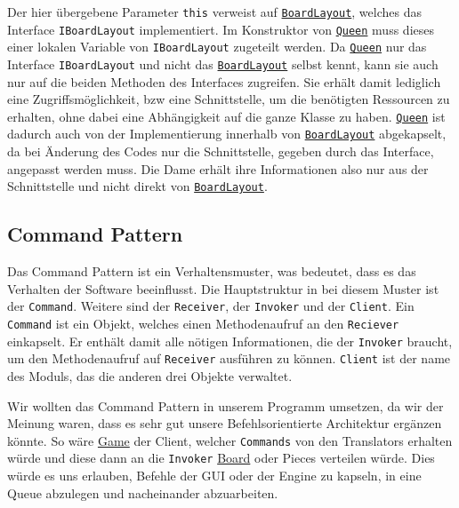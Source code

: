 \documentclass[
10pt, %
a4paper, %
oneside, %
headinclude,footinclude, %
BCOR5mm, %
]{scrartcl}
\begin{document}
\begin{onehalfspace}
Der hier übergebene Parameter \texttt{this} verweist auf \texttt{\href{https://github.com/schmida736/Chess-AdvancedSE/blob/main/Chess-AdvancedSE/Game\%20Elements/BoardLayout.cs}{BoardLayout}}, welches das Interface \texttt{IBoardLayout} implementiert. Im Konstruktor von \texttt{\href{https://github.com/schmida736/Chess-AdvancedSE/blob/main/Chess-AdvancedSE/Game\%20Elements/Pieces/Queen.cs}{Queen}} muss dieses einer lokalen Variable von \texttt{IBoardLayout} zugeteilt werden. Da \texttt{\href{https://github.com/schmida736/Chess-AdvancedSE/blob/main/Chess-AdvancedSE/Game\%20Elements/Pieces/Queen.cs}{Queen}} nur das Interface \texttt{IBoardLayout}
und nicht das \texttt{\href{https://github.com/schmida736/Chess-AdvancedSE/blob/main/Chess-AdvancedSE/Game\%20Elements/BoardLayout.cs}{BoardLayout}} selbst kennt, kann sie auch nur auf die beiden Methoden des Interfaces zugreifen. Sie erhält damit lediglich eine Zugriffsmöglichkeit, bzw eine Schnittstelle, um die benötigten Ressourcen zu erhalten, ohne dabei eine Abhängigkeit auf die ganze Klasse zu haben. \texttt{\href{https://github.com/schmida736/Chess-AdvancedSE/blob/main/Chess-AdvancedSE/Game\%20Elements/Pieces/Queen.cs}{Queen}} ist dadurch auch von der Implementierung innerhalb von \texttt{\href{https://github.com/schmida736/Chess-AdvancedSE/blob/main/Chess-AdvancedSE/Game\%20Elements/BoardLayout.cs}{BoardLayout}} abgekapselt, da bei Änderung des Codes nur die Schnittstelle, gegeben durch das Interface, angepasst werden muss. Die Dame erhält ihre Informationen also nur aus der Schnittstelle und nicht direkt von \texttt{\href{https://github.com/schmida736/Chess-AdvancedSE/blob/main/Chess-AdvancedSE/Game\%20Elements/BoardLayout.cs}{BoardLayout}}.
\subsection{Command Pattern}
Das Command Pattern ist ein Verhaltensmuster, was bedeutet, dass es das Verhalten der Software beeinflusst. Die Hauptstruktur in bei diesem Muster ist der \texttt{Command}. Weitere sind der \texttt{Receiver}, der \texttt{Invoker} und der \texttt{Client}. Ein \texttt{Command} ist ein Objekt, welches einen Methodenaufruf an den \texttt{Reciever} einkapselt. Er enthält damit alle nötigen Informationen, die der \texttt{Invoker} braucht, um den Methodenaufruf auf \texttt{Receiver} ausführen zu können. \texttt{Client} ist der name des Moduls, das die anderen drei Objekte verwaltet.

Wir wollten das Command Pattern in unserem Programm umsetzen, da wir der Meinung waren, dass es sehr gut unsere Befehlsorientierte Architektur ergänzen könnte. So wäre \href{https://github.com/schmida736/Chess-AdvancedSE/blob/main/Chess-AdvancedSE/Game\%20Elements/Game.cs}{Game} der Client, welcher \texttt{Commands} von den Translators erhalten würde und diese dann an die \texttt{Invoker} \href{https://github.com/schmida736/Chess-AdvancedSE/blob/main/Chess-AdvancedSE/Game\%20Elements/Board.cs}{Board} oder Pieces verteilen würde.
Dies würde es uns erlauben, Befehle der GUI oder der Engine zu kapseln, in eine Queue abzulegen und nacheinander abzuarbeiten.


\end{onehalfspace}
\end{document}
